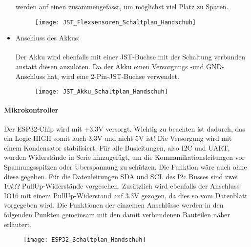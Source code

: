 \documentclass[titlepage,12pt,twoside]{article}
\begin{document}
\begin{itemize}
		  werden auf einen zusammengefasst, um möglichst viel Platz zu Sparen. \\
		  \begin{figure}[H]
			\begin{center}
				\scalebox{0.5}
				{\texttt{[image: JST\_Flexsensoren\_Schaltplan\_Handschuh]}}
			\end{center}
		\end{figure}
	\item Anschluss des Akkus: \\
		  \\
		  Der Akku wird ebenfalls mit einer JST-Buchse mit der Schaltung verbunden anstatt diesen anzulöten. Da der Akku einen
		  Versorgungs -und GND-Anschluss hat, wird eine 2-Pin-JST-Buchse verwendet. \\
		  \begin{figure}[H]
			\begin{center}
				\scalebox{0.5}
				{\texttt{[image: JST\_Akku\_Schaltplan\_Handschuh]}}
			\end{center}
		\end{figure}\end{itemize}

\paragraph{Mikrokontroller} 
\hfill \break
\hfill \break
Der ESP32-Chip wird mit +3.3V versorgt. Wichtig zu beachten ist dadurch, das ein Logic-HIGH somit auch 3.3V und nicht 5V ist!
Die Versorgung wird mit einem Kondensator stabilisiert. Für alle Busleitungen, also I2C und UART, wurden Widerstände in Serie
hinzugefügt, um die Kommunikationsleitungen vor Spannungsspitzen oder Überspannung zu schützen. Die Funktion wäre auch ohne diese
gegeben. Für die Datenleitungen SDA und SCL des I2c Busses sind zwei $10k\Omega$ PullUp-Widerstände vorgesehen. Zusätzlich 
wird ebenfalls der Anschluss IO16 mit einem PullUp-Widerstand auf 3.3V gezogen, da dies so vom Datenblatt vorgegeben wird. 
Die Funktionen der einzelnen Anschlüsse werden in den folgenden Punkten gemeinsam mit den damit verbundenen Bauteilen näher erläutert. \\
\begin{figure}[H]
	\begin{center}
		\scalebox{0.5}
		{\texttt{[image: ESP32\_Schaltplan\_Handschuh]}}
	\end{center}
\end{figure}
\end{document}
